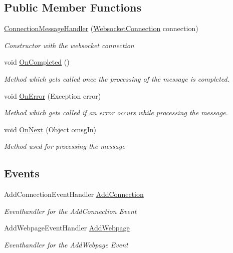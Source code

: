 \subsection*{Public Member Functions}
\begin{DoxyCompactItemize}
\item 
\hyperlink{class_web_analyzer_1_1_server_1_1_message_handler_1_1_connection_message_handler_af2d4c77349a43145f081e572a859952c}{Connection\+Message\+Handler} (\hyperlink{class_web_analyzer_1_1_server_1_1_websocket_connection}{Websocket\+Connection} connection)
\begin{DoxyCompactList}\small\item\em Constructor with the websocket connection \end{DoxyCompactList}\item 
void \hyperlink{class_web_analyzer_1_1_server_1_1_message_handler_1_1_connection_message_handler_aaa544cd527eafff7dff5a3070d4479f4}{On\+Completed} ()
\begin{DoxyCompactList}\small\item\em Method which gets called once the processing of the message is completed. \end{DoxyCompactList}\item 
void \hyperlink{class_web_analyzer_1_1_server_1_1_message_handler_1_1_connection_message_handler_a79ba446b3ba3d69f715d926ce896098d}{On\+Error} (Exception error)
\begin{DoxyCompactList}\small\item\em Method which gets called if an error occurs while processing the message. \end{DoxyCompactList}\item 
void \hyperlink{class_web_analyzer_1_1_server_1_1_message_handler_1_1_connection_message_handler_ac6e06ccaa5792fa911bd54d34a166eca}{On\+Next} (Object omsg\+In)
\begin{DoxyCompactList}\small\item\em Method used for processing the message \end{DoxyCompactList}\end{DoxyCompactItemize}
\subsection*{Events}
\begin{DoxyCompactItemize}
\item 
Add\+Connection\+Event\+Handler \hyperlink{class_web_analyzer_1_1_server_1_1_message_handler_1_1_connection_message_handler_a10b402c23b0015efb4b3643a064e7f09}{Add\+Connection}
\begin{DoxyCompactList}\small\item\em Eventhandler for the Add\+Connection Event \end{DoxyCompactList}\item 
Add\+Webpage\+Event\+Handler \hyperlink{class_web_analyzer_1_1_server_1_1_message_handler_1_1_connection_message_handler_a4a1e2b8d5b77a7559db92b1e1a07aed9}{Add\+Webpage}
\begin{DoxyCompactList}\small\item\em Eventhandler for the Add\+Webpage Event \end{DoxyCompactList}\end{DoxyCompactItemize}
